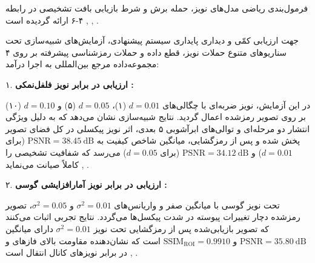 

فرمول‌بندی ریاضی مدل‌های نویز، حمله برش و شرط بازیابی بافت تشخیصی در رابطه ۴{-}۶ ارائه گردیده است , , .\par






جهت ارزیابی کمّی و دیداری پایداری سیستم پیشنهادی، آزمایش‌های شبیه‌سازی تحت سناریوهای متنوع حملات نویز، قطع داده و حملات رمزشناسی پیشرفته بر روی ۴ مجموعه‌داده مرجع بین‌المللی به اجرا درآمد:\par



۱. \textbf{ارزیابی در برابر نویز فلفل‌نمکی :}\par

در این آزمایش، نویز ضربه‌ای با چگالی‌های $d = 0.01$ (۱)، $d = 0.05$ (۵) و $d = 0.10$ (۱۰) بر روی تصویر رمزشده اعمال گردید. نتایج شبیه‌سازی نشان می‌دهد که به دلیل ویژگی انتشار دو مرحله‌ای  و توالی‌های ابرآشوبی ۵ بعدی، اثر نویز پیکسلی در کل فضای تصویر پخش شده و پس از رمزگشایی، میانگین شاخص کیفیت به $\mathrm{PSNR} = 38.45\mathrm{\ dB}$ (برای $d=0.01$) و $\mathrm{PSNR} = 34.12\mathrm{\ dB}$ (برای $d=0.05$) می‌رسد که شفافیت تشخیصی  را کاملاً صیانت می‌نماید , .\par



۲. \textbf{ارزیابی در برابر نویز آمارافزایشی گوسی :}\par

تحت نویز گوسی با میانگین صفر و واریانس‌های $\sigma^2 = 0.01$ و $\sigma^2 = 0.05$، تصویر رمزشده دچار تغییرات پیوسته در شدت پیکسل‌ها می‌گردد. نتایج تجربی اثبات می‌کنند که تصویر بازیابی‌شده پس از رمزگشایی تحت نویز $\sigma^2 = 0.01$ دارای میانگین $\mathrm{PSNR} = 35.80\mathrm{\ dB}$ و $\mathrm{SSIM}_{\mathrm{ROI}} = 0.9910$ است که نشان‌دهنده مقاومت بالای فازهای  و  در برابر نویزهای کانال انتقال است , .\par

